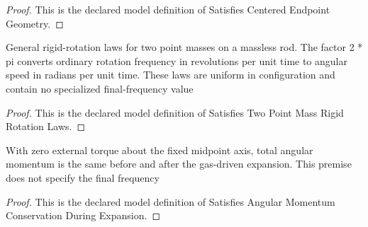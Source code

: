 \begin{proof}
  This is the declared model definition of Satisfies Centered Endpoint Geometry.
\end{proof}
\begin{definition}
  \label{def:physics:phyx-mini-0711:phyxminiproblems-problemphyxmini0711-satisfiestwopointmassrigidrotationlaws}
  General rigid-rotation laws for two point masses on a massless rod. The factor 2 * pi converts ordinary rotation frequency in revolutions per unit time to angular speed in radians per unit time. These laws are uniform in configuration and contain no specialized final-frequency value
\end{definition}
\begin{proof}
  This is the declared model definition of Satisfies Two Point Mass Rigid Rotation Laws.
\end{proof}
\begin{definition}
  \label{def:physics:phyx-mini-0711:phyxminiproblems-problemphyxmini0711-satisfiesangularmomentumconservationduringexpansion}
  With zero external torque about the fixed midpoint axis, total angular momentum is the same before and after the gas-driven expansion. This premise does not specify the final frequency
\end{definition}
\begin{proof}
  This is the declared model definition of Satisfies Angular Momentum Conservation During Expansion.
\end{proof}
